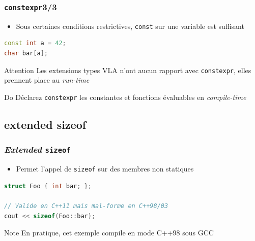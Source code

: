 \documentclass[C++.tex]{subfiles}
\begin{document}
\begin{frame}[fragile]
	\frametitle{\lstinline|constexpr|\titlehfill{}3/3}
	\begin{itemize}
		\item Sous certaines conditions restrictives, \lstinline|const| sur une variable est suffisant

	\end{itemize}

	\begin{lstlisting}[language=C++]
const int a = 42;
char bar[a];\end{lstlisting}

	\begin{alertblock}{Attention}
		Les extensions types VLA n'ont aucun rapport avec \lstinline|constexpr|, elles prennent place au \textit{run-time}
	\end{alertblock}


	\begin{exampleblock}{Do}
		Déclarez \lstinline|constexpr| les constantes et fonctions évaluables en \textit{compile-time}
	\end{exampleblock}
\end{frame}

\subsection*{extended sizeof}
\begin{frame}[fragile]
	\frametitle{\textit{Extended} \lstinline|sizeof|}
	\begin{itemize}
		\item Permet l'appel de \lstinline|sizeof| sur des membres non statiques
	\end{itemize}

	\begin{lstlisting}[language=C++]
struct Foo { int bar; };

// Valide en C++11 mais mal-forme en C++98/03
cout << sizeof(Foo::bar); \end{lstlisting}


	\begin{block}{Note}
		En pratique, cet exemple compile en mode C++98 sous GCC

	\end{block}
\end{frame}
\end{document}
